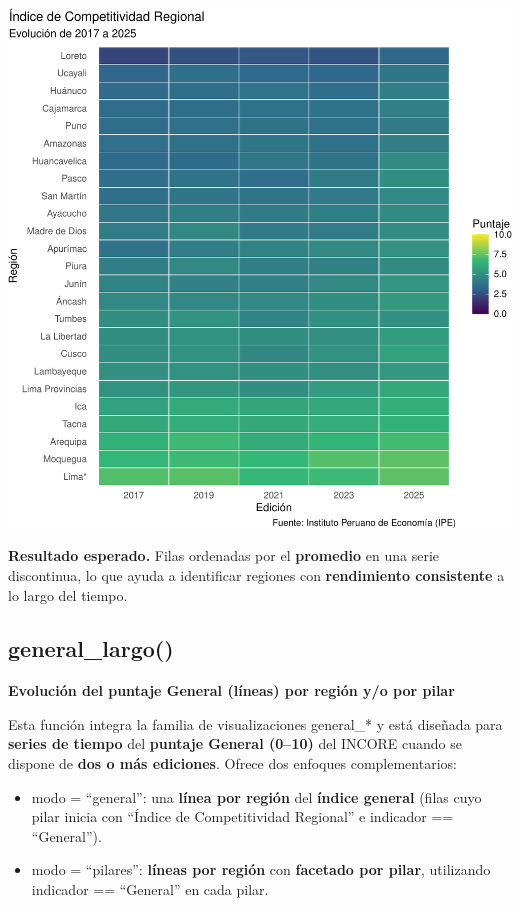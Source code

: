 \documentclass[
  11pt,
  letterpaper,
  DIV=11,
  numbers=noendperiod]{scrartcl}
\begin{document}
\includegraphics{Manual_files/figure-pdf/unnamed-chunk-35-1.pdf}

\textbf{Resultado esperado.} Filas ordenadas por el \textbf{promedio} en
una serie discontinua, lo que ayuda a identificar regiones con
\textbf{rendimiento consistente} a lo largo del tiempo.

\subsection{\texorpdfstring{\textbf{general\_largo()}}{general\_largo()}}\label{general_largo}

\textbf{Evolución del puntaje General (líneas) por región y/o por pilar}

Esta función integra la familia de visualizaciones general\_* y está
diseñada para \textbf{series de tiempo} del \textbf{puntaje General
(0--10)} del INCORE cuando se dispone de \textbf{dos o más ediciones}.
Ofrece dos enfoques complementarios:

\begin{itemize}
\item
  modo = ``general'': una \textbf{línea por región} del \textbf{índice
  general} (filas cuyo pilar inicia con ``Índice de Competitividad
  Regional'' e indicador == ``General'').
\item
  modo = ``pilares'': \textbf{líneas por región} con \textbf{facetado
  por pilar}, utilizando indicador == ``General'' en cada pilar.
\end{itemize}
\end{document}
